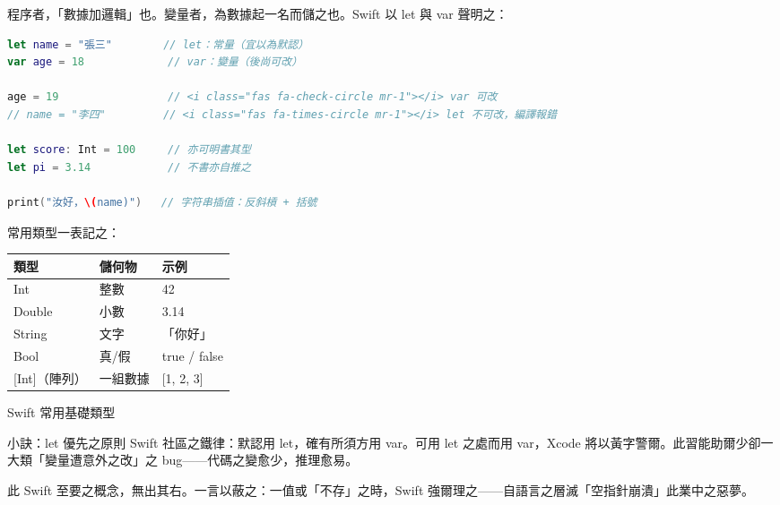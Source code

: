 


程序者，「數據加邏輯」也。變量者，為數據起一名而儲之也。Swift 以 let 與 var 聲明之：

\begin{lstlisting}[language=Swift]
let name = "張三"        // let：常量（宜以為默認）
var age = 18             // var：變量（後尚可改）

age = 19                 // <i class="fas fa-check-circle mr-1"></i> var 可改
// name = "李四"         // <i class="fas fa-times-circle mr-1"></i> let 不可改，編譯報錯

let score: Int = 100     // 亦可明書其型
let pi = 3.14            // 不書亦自推之

print("汝好，\(name)")   // 字符串插值：反斜槓 + 括號
\end{lstlisting}

常用類型一表記之：

\begin{center}
\begin{tabularx}{\linewidth}{|X|X|X|}
\hline
\textbf{類型} & \textbf{儲何物} & \textbf{示例} \tabularnewline
\hline
Int & 整數 & 42 \tabularnewline
Double & 小數 & 3.14 \tabularnewline
String & 文字 & 「你好」 \tabularnewline
Bool & 真/假 & true / false \tabularnewline
{}[Int]（陣列） & 一組數據 & {}[1, 2, 3] \tabularnewline
\hline
\end{tabularx}
\end{center}

\begin{center}\small\color{gray}Swift 常用基礎類型\end{center}

\begin{tcbinfo}{小訣：let 優先之原則}
Swift 社區之鐵律：默認用 let，確有所須方用 var。可用 let 之處而用 var，Xcode 將以黃字警爾。此習能助爾少卻一大類「變量遭意外之改」之 bug——代碼之變愈少，推理愈易。

\end{tcbinfo}


此 Swift 至要之概念，無出其右。一言以蔽之：一值或「不存」之時，Swift 強爾理之——自語言之層滅「空指針崩潰」此業中之惡夢。

